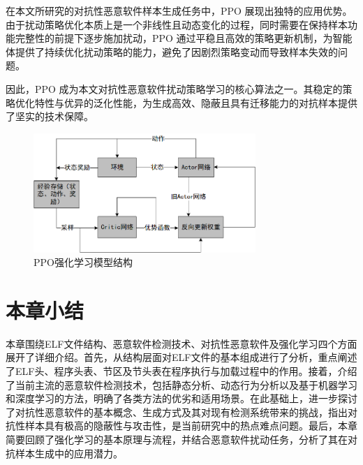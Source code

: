 在本文所研究的对抗性恶意软件样本生成任务中，PPO 展现出独特的应用优势。由于扰动策略优化本质上是一个非线性且动态变化的过程，同时需要在保持样本功能完整性的前提下逐步施加扰动，PPO 通过平稳且高效的策略更新机制，为智能体提供了持续优化扰动策略的能力，避免了因剧烈策略变动而导致样本失效的问题。

因此，PPO 成为本文对抗性恶意软件扰动策略学习的核心算法之一。其稳定的策略优化特性与优异的泛化性能，为生成高效、隐蔽且具有迁移能力的对抗样本提供了坚实的技术保障。

\begin{figure}[hbt]
	\centering
	\includegraphics[width=0.75\textwidth]{figures/2.6}
	\caption{PPO强化学习模型结构}\label{fig:2.6}
\end{figure}

\section{本章小结}

本章围绕ELF文件结构、恶意软件检测技术、对抗性恶意软件及强化学习四个方面展开了详细介绍。首先，从结构层面对ELF文件的基本组成进行了分析，重点阐述了ELF头、程序头表、节区及节头表在程序执行与加载过程中的作用。接着，介绍了当前主流的恶意软件检测技术，包括静态分析、动态行为分析以及基于机器学习和深度学习的方法，明确了各类方法的优劣和适用场景。在此基础上，进一步探讨了对抗性恶意软件的基本概念、生成方式及其对现有检测系统带来的挑战，指出对抗性样本具有极高的隐蔽性与攻击性，是当前研究中的热点难点问题。最后，本章简要回顾了强化学习的基本原理与流程，并结合恶意软件扰动任务，分析了其在对抗样本生成中的应用潜力。


